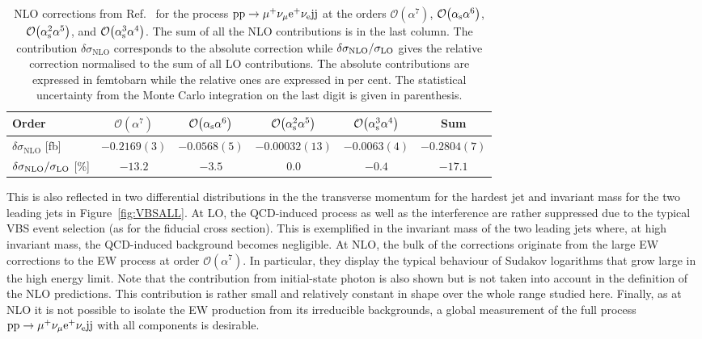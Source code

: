 \begin{table}
\begin{center}
\begin{tabular}{|l||c|c|c|c||c|}
\hline
Order & $\mathcal{O}{\left(\alpha^{7}\right)}$ & $\mathcal{O}{\left(\alpha_{\rm s}\alpha^{6}\right)}$ & $\mathcal{O}{\left(\alpha_{\rm s}^{2}\alpha^{5}\right)}$ & $\mathcal{O}{\left(\alpha_{\rm s}^{3}\alpha^{4}\right)}$ & Sum \\
\hline
\hline 
${\delta \sigma_{\mathrm{NLO}}}$ [fb] 
& $-0.2169(3)$ 
& $-0.0568(5)$
& $-0.00032(13)$
& $-0.0063(4)$ 
& $-0.2804(7)$ \\
\hline
$\delta \sigma_{\mathrm{NLO}}/\sigma_{\rm LO}$ [\%] & $-13.2$ & $-3.5$ & $0.0$ & $-0.4$ & $-17.1$ \\
\hline
\end{tabular}
\end{center}
\caption{
NLO corrections from Ref.~\cite{Biedermann:2017bss} for the process ${\rm p}{\rm p}\to\mu^+\nu_\mu{\rm e}^+\nu_{\rm e}{\rm j}{\rm j}$ at the orders 
$\mathcal{O}{\left(\alpha^{7}\right)}$, $\mathcal{O}{\left(\alpha_{\rm s}\alpha^{6}\right)}$, $\mathcal{O}{\left(\alpha_{\rm s}^{2}\alpha^{5}\right)}$, and $\mathcal{O}{\left(\alpha_{\rm s}^{3}\alpha^{4}\right)}$.
The sum of all the NLO contributions is in the last column.
The contribution $\delta\sigma_{\mathrm{NLO}}$ corresponds to the absolute correction while $\delta \sigma_{\mathrm{NLO}}/\sigma_{\rm LO}$ gives the relative correction normalised to the sum of all LO contributions.
The absolute contributions are expressed in femtobarn while the relative ones are expressed in per cent.
The statistical uncertainty from the Monte Carlo integration on the last digit is given in parenthesis.}
\label{table:NLOVBS}
\end{table}

This is also reflected in two differential distributions in the the transverse momentum for the hardest jet and invariant mass for the two leading jets in Figure~\ref{fig:VBSALL}.
At LO, the QCD-induced process as well as the interference are rather suppressed due to the typical VBS event selection (as for the fiducial cross section).
This is exemplified in the invariant mass of the two leading jets where, at high invariant mass, the QCD-induced background becomes negligible.
At NLO, the bulk of the corrections originate from the large EW corrections to the EW process at order $\mathcal{O}{\left(\alpha^{7}\right)}$.
In particular, they display the typical behaviour of Sudakov logarithms that grow large in the high energy limit.
Note that the contribution from initial-state photon is also shown but is not taken into account in the definition of the NLO predictions.
This contribution is rather small and relatively constant in shape over the whole range studied here.
Finally, as at NLO it is not possible to isolate the EW production from its irreducible backgrounds, a global measurement of the full process ${\rm p}{\rm p}\to\mu^+\nu_\mu{\rm e}^+\nu_{\rm e}{\rm j}{\rm j}$ with all components is desirable.

